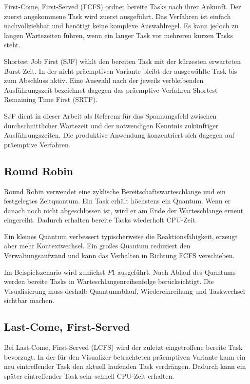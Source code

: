 First-Come, First-Served (FCFS) ordnet bereite Tasks nach ihrer Ankunft. Der zuerst angekommene Task wird zuerst ausgeführt. Das Verfahren ist einfach nachvollziehbar und benötigt keine komplexe Auswahlregel. Es kann jedoch zu langen Wartezeiten führen, wenn ein langer Task vor mehreren kurzen Tasks steht.

Shortest Job First (SJF) wählt den bereiten Task mit der kürzesten erwarteten Burst-Zeit. In der nicht-präemptiven Variante bleibt der ausgewählte Task bis zum Abschluss aktiv. Eine Auswahl nach der jeweils verbleibenden Ausführungszeit bezeichnet dagegen das präemptive Verfahren Shortest Remaining Time First (SRTF).

SJF dient in dieser Arbeit als Referenz für das Spannungsfeld zwischen durchschnittlicher Wartezeit und der notwendigen Kenntnis zukünftiger Ausführungszeiten. Die produktive Anwendung konzentriert sich dagegen auf präemptive Verfahren.

\subsection{Round Robin}

Round Robin verwendet eine zyklische Bereitschaftswarteschlange und ein festgelegtes Zeitquantum. Ein Task erhält höchstens ein Quantum. Wenn er danach noch nicht abgeschlossen ist, wird er am Ende der Warteschlange erneut eingereiht. Dadurch erhalten bereite Tasks wiederholt CPU-Zeit.

Ein kleines Quantum verbessert typischerweise die Reaktionsfähigkeit, erzeugt aber mehr Kontextwechsel. Ein großes Quantum reduziert den Verwaltungsaufwand und kann das Verhalten in Richtung FCFS verschieben.

Im Beispielszenario wird zunächst $P1$ ausgeführt. Nach Ablauf des Quantums werden bereite Tasks in Warteschlangenreihenfolge berücksichtigt. Die Visualisierung muss deshalb Quantumablauf, Wiedereinreihung und Taskwechsel sichtbar machen.

\subsection{Last-Come, First-Served}

Bei Last-Come, First-Served (LCFS) wird der zuletzt eingetroffene bereite Task bevorzugt. In der für den Visualizer betrachteten präemptiven Variante kann ein neu eintreffender Task den aktuell laufenden Task verdrängen. Dadurch kann ein später eintreffender Task sehr schnell CPU-Zeit erhalten.

